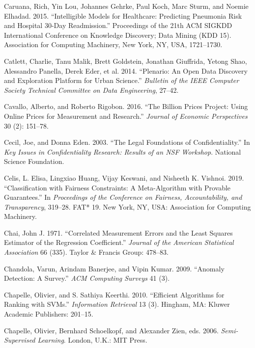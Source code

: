 \documentclass[]{krantz}
\begin{document}
\hypertarget{ref-Caruana2015}{}
Caruana, Rich, Yin Lou, Johannes Gehrke, Paul Koch, Marc Sturm, and
Noemie Elhadad. 2015. ``Intelligible Models for Healthcare: Predicting
Pneumonia Risk and Hospital 30-Day Readmission.'' Proceedings of the
21th ACM SIGKDD International Conference on Knowledge Discovery; Data
Mining (KDD 15). Association for Computing Machinery, New York, NY, USA,
1721--1730.

\hypertarget{ref-plenario}{}
Catlett, Charlie, Tanu Malik, Brett Goldstein, Jonathan Giuffrida,
Yetong Shao, Alessandro Panella, Derek Eder, et al. 2014. ``Plenario: An
Open Data Discovery and Exploration Platform for Urban Science.''
\emph{Bulletin of the IEEE Computer Society Technical Committee on Data
Engineering}, 27--42.

\hypertarget{ref-cavallo2016billion}{}
Cavallo, Alberto, and Roberto Rigobon. 2016. ``The Billion Prices
Project: Using Online Prices for Measurement and Research.''
\emph{Journal of Economic Perspectives} 30 (2): 151--78.

\hypertarget{ref-Cecil2003}{}
Cecil, Joe, and Donna Eden. 2003. ``The Legal Foundations of
Confidentiality.'' In \emph{Key Issues in Confidentiality Research:
Results of an NSF Workshop}. National Science Foundation.

\hypertarget{ref-celis2019}{}
Celis, L. Elisa, Lingxiao Huang, Vijay Keswani, and Nisheeth K. Vishnoi.
2019. ``Classification with Fairness Constraints: A Meta-Algorithm with
Provable Guarantees.'' In \emph{Proceedings of the Conference on
Fairness, Accountability, and Transparency}, 319--28. FAT* 19. New York,
NY, USA: Association for Computing Machinery.

\hypertarget{ref-chai1971correlated}{}
Chai, John J. 1971. ``Correlated Measurement Errors and the Least
Squares Estimator of the Regression Coefficient.'' \emph{Journal of the
American Statistical Association} 66 (335). Taylor \& Francis Group:
478--83.

\hypertarget{ref-chandola2009anomaly}{}
Chandola, Varun, Arindam Banerjee, and Vipin Kumar. 2009. ``Anomaly
Detection: A Survey.'' \emph{ACM Computing Surveys} 41 (3).

\hypertarget{ref-Chapelle2010}{}
Chapelle, Olivier, and S. Sathiya Keerthi. 2010. ``Efficient Algorithms
for Ranking with SVMs.'' \emph{Information Retrieval} 13 (3). Hingham,
MA: Kluwer Academic Publishers: 201--15.

\hypertarget{ref-Chapelle2006}{}
Chapelle, Olivier, Bernhard Schoelkopf, and Alexander Zien, eds. 2006.
\emph{Semi-Supervised Learning}. London, U.K.: MIT Press.
\end{document}
